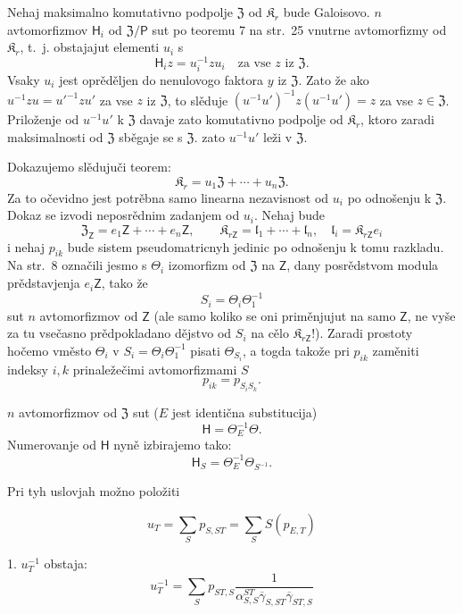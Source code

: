 \documentclass[11pt]{article}
\begin{document}
Nehaj maksimalno komutativno podpolje \(\mathfrak Z\) od \(\mathfrak K_r\) bude Galoisovo. \(n\) avtomorfizmov \(\mathsf{H}_i\) od \(\mathfrak Z/\mathsf P\) sut po teoremu 7 na str.~25 vnutrne avtomorfizmy od \(\mathfrak K_r\), t.~j. obstajajut elementi \(u_i\) s
\[
\mathsf{H}_i z=u_i^{-1}zu_i\quad\text{za vse }z\text{ iz }\mathfrak Z.
\]
Vsaky \(u_i\) jest oprěděljen do nenulovogo faktora \(y\) iz \(\mathfrak Z\). Zato že ako \(u^{-1}zu=u'^{-1}zu'\) za vse \(z\) iz \(\mathfrak Z\), to slěduje \((u^{-1}u')^{-1}z(u^{-1}u')=z\) za vse \(z\in\mathfrak Z\). Priloženje od \(u^{-1}u'\) k \(\mathfrak Z\) davaje zato komutativno podpolje od \(\mathfrak K_r\), ktoro zaradi maksimalnosti od \(\mathfrak Z\) sběgaje se s \(\mathfrak Z\). zato \(u^{-1}u'\) leži v \(\mathfrak Z\).

Dokazujemo slědujuči teorem:
\[
\mathfrak K_r=u_1\mathfrak Z+\cdots+u_n\mathfrak Z.
\]
Za to očevidno jest potrěbna samo linearna nezavisnost od \(u_i\) po odnošenju k \(\mathfrak Z\). Dokaz se izvodi neposrědnim zadanjem od \(u_i\). Nehaj bude
\[
\mathfrak Z_{\mathsf{Z}}=e_1\mathsf{Z}+\cdots+e_n\mathsf{Z},\qquad
\mathfrak K_{r\mathsf{Z}}=\mathfrak l_1+\cdots+\mathfrak l_n,\quad
\mathfrak l_i=\mathfrak K_{r\mathsf{Z}}e_i
\]
i nehaj \(p_{ik}\) bude sistem pseudomatricnyh jedinic po odnošenju k tomu razkladu. Na str.~8 označili jesmo s \(\Theta_i\) izomorfizm od \(\mathfrak Z\) na \(\mathsf{Z}\), dany posrědstvom modula prědstavjenja \(e_i\mathsf{Z}\), tako že
\[
S_i=\Theta_i\Theta_1^{-1}
\]
sut \(n\) avtomorfizmov od \(\mathsf{Z}\) (ale samo koliko se oni priměnjujut na samo \(\mathsf{Z}\), ne vyše za tu vsečasno prědpokladano dějstvo od \(S_i\) na cělo \(\mathfrak K_{r\mathsf{Z}}\)!). Zaradi prostoty hočemo vměsto \(\Theta_i\) v \(S_i=\Theta_i\Theta_1^{-1}\) pisati \(\Theta_{S_i}\), a togda takože pri \(p_{ik}\) zaměniti indeksy \(i,k\) prinaležečimi avtomorfizmami \(S\)
\[
p_{ik}=p_{S_iS_k}.
\]

\(n\) avtomorfizmov od \(\mathfrak Z\) sut (\(E\) jest identična substitucija)
\[
\mathsf{H}=\Theta_E^{-1}\Theta.
\]
Numerovanje od \(\mathsf{H}\) nyně izbirajemo tako:
\[
\mathsf{H}_S=\Theta_E^{-1}\Theta_{S^{-1}}.
\]

Pri tyh uslovjah možno položiti

\[
u_T=\sum_S p_{S,ST}=\sum_S S(p_{E,T})
\]



1. \(u_T^{-1}\) obstaja:
\[
u_T^{-1}=\sum_S p_{ST,S}
\frac{1}{\alpha_{S,S}^{ST}\overline{\gamma}_{S,ST}\overline{\gamma}_{ST,S}}
\]
\end{document}
